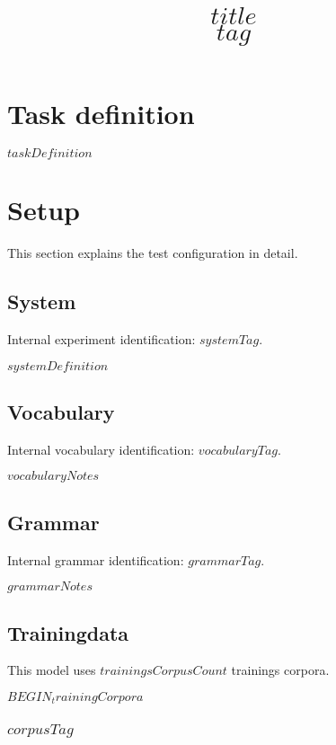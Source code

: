 \documentclass[a4paper,10pt,bibtotoc]{scrartcl}
\title{$title$\\$tag$}
\begin{document}
\maketitle

\begin{multicols}{2}

\tableofcontents


\section{Task definition}
$taskDefinition$

\section{Setup}

This section explains the test configuration in detail.

\subsection{System}
\label{sec:System}

Internal experiment identification: $systemTag$.

$systemDefinition$

\subsection{Vocabulary}

Internal vocabulary identification: $vocabularyTag$.

$vocabularyNotes$

\subsection{Grammar}

Internal grammar identification: $grammarTag$.

$grammarNotes$

\subsection{Trainingdata}

This model uses $trainingsCorpusCount$ trainings corpora.

$BEGIN_trainingCorpora$
\subsubsection{$corpusTag$}


\end{multicols}
\end{document}
